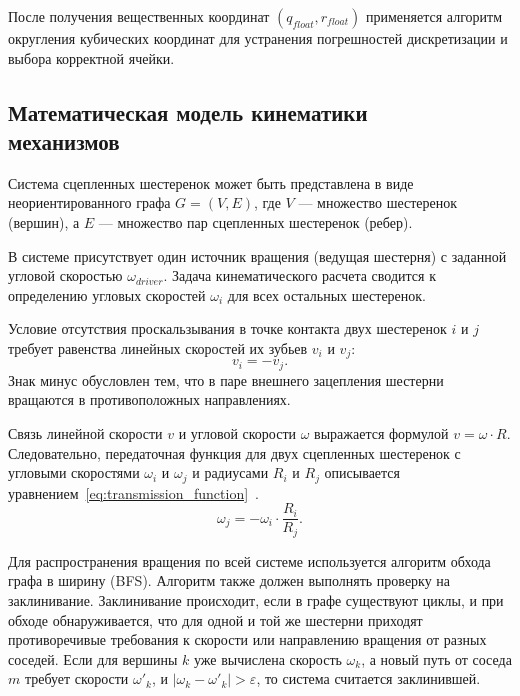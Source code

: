 После получения вещественных координат $(q_{float}, r_{float})$ применяется алгоритм округления кубических координат для устранения погрешностей дискретизации и выбора корректной ячейки.

\subsection[Математическая модель кинематики механизмов]{Математическая модель кинематики \\ механизмов}

Система сцепленных шестеренок может быть представлена в виде неориентированного графа $G = (V, E)$, где $V$ --- множество шестеренок (вершин), а $E$ --- множество пар сцепленных шестеренок (ребер).

В системе присутствует один источник вращения (ведущая шестерня) с заданной угловой скоростью $\omega_{driver}$. Задача кинематического расчета сводится к определению угловых скоростей $\omega_i$ для всех остальных шестеренок.

Условие отсутствия проскальзывания в точке контакта двух шестеренок $i$ и $j$ требует равенства линейных скоростей их зубьев $v_i$ и $v_j$:
\begin{equation}
	v_i = -v_j.
\end{equation}
Знак минус обусловлен тем, что в паре внешнего зацепления шестерни вращаются в противоположных направлениях.

Связь линейной скорости $v$ и угловой скорости $\omega$ выражается формулой $v = \omega \cdot R$. Следовательно, передаточная функция для двух сцепленных шестеренок с угловыми скоростями $\omega_i$ и $\omega_j$ и радиусами $R_i$ и $R_j$ описывается уравнением~\eqref{eq:transmission_function}~\cite{artobolevsky}.
\begin{equation}
	\omega_j = -\omega_i \cdot \frac{R_i}{R_j}.
	\label{eq:transmission_function}
\end{equation}

Для распространения вращения по всей системе используется алгоритм обхода графа в ширину (BFS).
Алгоритм также должен выполнять проверку на заклинивание. Заклинивание происходит, если в графе существуют циклы, и при обходе обнаруживается, что для одной и той же шестерни приходят противоречивые требования к скорости или направлению вращения от разных соседей. Если для вершины $k$ уже вычислена скорость $\omega_k$, а новый путь от соседа $m$ требует скорости $\omega'_k$, и $|\omega_k - \omega'_k| > \varepsilon$, то система считается заклинившей.

